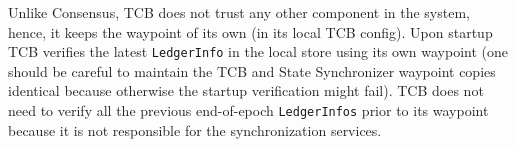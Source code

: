 \documentclass[letterpaper,10pt]{article}
\begin{document}
Unlike Consensus, TCB does not trust any other component in the system, hence, it keeps the waypoint of its own (in its local TCB config). Upon startup TCB verifies the latest \texttt{LedgerInfo} in the local store using its own waypoint (one should be careful to maintain the TCB and State Synchronizer waypoint copies identical because otherwise the startup verification might fail). TCB does not need to verify all the previous end-of-epoch \texttt{LedgerInfos} prior to its waypoint because it is not responsible for the synchronization services.

\begingroup


\endgroup
\end{document}
